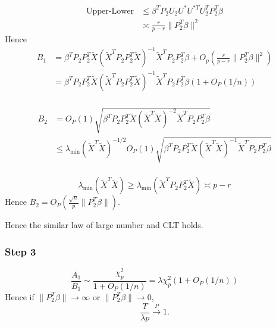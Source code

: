 \documentclass[review]{elsarticle}
\theoremstyle{plain}
\theoremstyle{definition}
\theoremstyle{remark}
\begin{document}
\begin{equation}
    \begin{aligned}
        \textrm{Upper-Lower}&\leq \beta^T P_2 U_2 U^* U^{*T}U_2^T P_2^T \beta\\
        &\asymp \frac{r}{p-r}\|P_2^T \beta\|^2
    \end{aligned}
\end{equation}
Hence 
\begin{equation}
    \begin{aligned}
        B_1&=\beta^T P_2 P_2^T \tilde{X} {(\tilde{X}^T P_2 P_2^T \tilde{X})}^{-1}\tilde{X}^T P_2 P_2^T \beta+O_p(\frac{r}{p-r}\|P_2^T \beta\|^2)\\
        &=\beta^T P_2 P_2^T \tilde{X} {(\tilde{X}^T P_2 P_2^T \tilde{X})}^{-1}\tilde{X}^T P_2 P_2^T \beta(1+O_P(1/n))\\
    \end{aligned}
\end{equation}



\begin{equation}
    \begin{aligned}
    B_2&=O_P(1)\sqrt{\beta^T P_2 P_2^T \tilde{X}{(\tilde{X}^T\tilde{X})}^{-2}\tilde{X}^T P_2 P_2^T \beta}\\
    &\leq \lambda_{\min}{(\tilde{X}^T\tilde{X})}^{-1/2}O_P(1)\sqrt{\beta^T P_2 P_2^T \tilde{X}{(\tilde{X}^T\tilde{X})}^{-1}\tilde{X}^T P_2 P_2^T \beta}\\
    \end{aligned}
\end{equation}

\begin{equation}
    \lambda_{\min}{(\tilde{X}^T\tilde{X})}\geq \lambda_{\min}{(\tilde{X}^T P_2 P_2^T \tilde{X})}\asymp p-r
\end{equation}
Hence $B_2=O_P(\frac{\sqrt{n}}{p}\|P_2^T \beta\|)$.

Hence the similar law of large number and CLT holds.
\subsubsection{Step 3}
\begin{equation}
    \frac{A_1}{B_1}\sim \frac{\chi^2_p}{1+O_P(1/n)}= \lambda\chi^2_p (1+O_P(1/n))
\end{equation}
Hence if $\|P_2^T\beta\|\to \infty$ or $\|P_2^T \beta\|\to 0$,
\begin{equation}
    \frac{T}{\lambda p}\xrightarrow{P} 1.
\end{equation}
\end{document}

